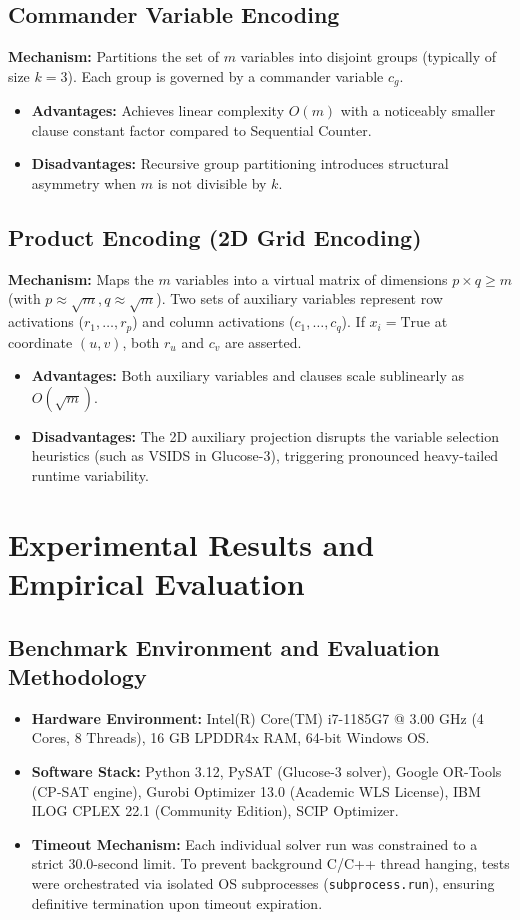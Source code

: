 \documentclass[a4paper,11pt]{article}
\begin{document}
\subsection{Commander Variable Encoding}
\textbf{Mechanism:} Partitions the set of $m$ variables into disjoint groups (typically of size $k = 3$). Each group is governed by a commander variable $c_g$.
\begin{itemize}
    \item \textbf{Advantages:} Achieves linear complexity $O(m)$ with a noticeably smaller clause constant factor compared to Sequential Counter.
    \item \textbf{Disadvantages:} Recursive group partitioning introduces structural asymmetry when $m$ is not divisible by $k$.
\end{itemize}

\subsection{Product Encoding (2D Grid Encoding)}
\textbf{Mechanism:} Maps the $m$ variables into a virtual matrix of dimensions $p \times q \ge m$ (with $p \approx \sqrt{m}, q \approx \sqrt{m}$). Two sets of auxiliary variables represent row activations ($r_1, \dots, r_p$) and column activations ($c_1, \dots, c_q$). If $x_i = \text{True}$ at coordinate $(u, v)$, both $r_u$ and $c_v$ are asserted.
\begin{itemize}
    \item \textbf{Advantages:} Both auxiliary variables and clauses scale sublinearly as $O(\sqrt{m})$.
    \item \textbf{Disadvantages:} The 2D auxiliary projection disrupts the variable selection heuristics (such as VSIDS in Glucose-3), triggering pronounced heavy-tailed runtime variability.
\end{itemize}

\section{Experimental Results and Empirical Evaluation}

\subsection{Benchmark Environment and Evaluation Methodology}
\begin{itemize}
    \item \textbf{Hardware Environment:} Intel(R) Core(TM) i7-1185G7 @ 3.00 GHz (4 Cores, 8 Threads), 16 GB LPDDR4x RAM, 64-bit Windows OS.
    \item \textbf{Software Stack:} Python 3.12, PySAT (Glucose-3 solver), Google OR-Tools (CP-SAT engine), Gurobi Optimizer 13.0 (Academic WLS License), IBM ILOG CPLEX 22.1 (Community Edition), SCIP Optimizer.
    \item \textbf{Timeout Mechanism:} Each individual solver run was constrained to a strict 30.0-second limit. To prevent background C/C++ thread hanging, tests were orchestrated via isolated OS subprocesses (\texttt{subprocess.run}), ensuring definitive termination upon timeout expiration.
\end{itemize}
\end{document}
